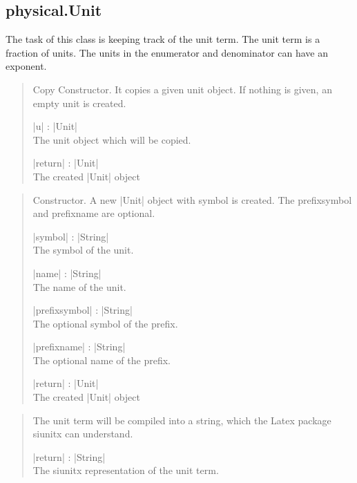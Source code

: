 \documentclass{ltxdoc}
\begin{document}
%
%
%
%
\subsection{physical.Unit}

The task of this class is keeping track of the unit term. The unit term is a fraction of units. The units in the enumerator and denominator can have an exponent. 


\begin{quote}
  Copy Constructor. It copies a given unit object. If nothing is given, an empty unit is created.

  \subtitle{Parameters}
  \begin{description}
  \item |u| : |Unit|\\
    The unit object which will be copied.

  \item |return| : |Unit|\\
    The created |Unit| object
  \end{description}

\end{quote}


\begin{quote}
  Constructor. A new |Unit| object with symbol is created. The prefixsymbol and prefixname are optional. 

  \subtitle{Parameters}
  \begin{description}
  \item |symbol| : |String|\\
    The symbol of the unit.

  \item |name| : |String|\\
    The name of the unit.

  \item |prefixsymbol| : |String|\\
    The optional symbol of the prefix. 

  \item |prefixname| : |String|\\
    The optional name of the prefix. 

  \item |return| : |Unit|\\
    The created |Unit| object
  \end{description}

\end{quote}




\begin{quote}
  The unit term will be compiled into a string, which the Latex package siunitx can understand.

  \subtitle{Parameters}
  \begin{description}
  \item |return| : |String|\\
    The siunitx representation of the unit term.
  \end{description}

\end{quote}
\end{document}
